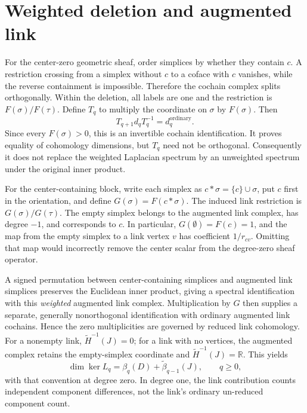 \documentclass[10pt]{article}
\newcommand{\R}{\mathbb{R}}
\begin{document}
\section{Weighted deletion and augmented link}
For the center-zero geometric sheaf, order simplices by whether they contain $c$. A restriction crossing from a simplex without $c$ to a coface with $c$ vanishes, while the reverse containment is impossible. Therefore the cochain complex splits orthogonally. Within the deletion, all labels are one and the restriction is $F(\sigma)/F(\tau)$. Define $T_q$ to multiply the coordinate on $\sigma$ by $F(\sigma)$. Then
\begin{equation}
T_{q+1}d_qT_q^{-1}=d_q^{\mathrm{ordinary}}.
\end{equation}
Since every $F(\sigma)>0$, this is an invertible cochain identification. It proves equality of cohomology dimensions, but $T_q$ need not be orthogonal. Consequently it does not replace the weighted Laplacian spectrum by an unweighted spectrum under the original inner product.

For the center-containing block, write each simplex as $c*\sigma=\{c\}\cup\sigma$, put $c$ first in the orientation, and define $G(\sigma)=F(c*\sigma)$. The induced link restriction is $G(\sigma)/G(\tau)$. The empty simplex belongs to the augmented link complex, has degree $-1$, and corresponds to $c$. In particular, $G(\emptyset)=F(c)=1$, and the map from the empty simplex to a link vertex $v$ has coefficient $1/r_{cv}$. Omitting that map would incorrectly remove the center scalar from the degree-zero sheaf operator.

A signed permutation between center-containing simplices and augmented link simplices preserves the Euclidean inner product, giving a spectral identification with this \emph{weighted} augmented link complex. Multiplication by $G$ then supplies a separate, generally nonorthogonal identification with ordinary augmented link cochains. Hence the zero multiplicities are governed by reduced link cohomology. For a nonempty link, $\widetilde H^{-1}(J)=0$; for a link with no vertices, the augmented complex retains the empty-simplex coordinate and $\widetilde H^{-1}(J)=\R$. This yields
\begin{equation}
\dim\ker L_q=\beta_q(D)+\widetilde\beta_{q-1}(J),\qquad q\geq0,
\end{equation}
with that convention at degree zero. In degree one, the link contribution counts independent component differences, not the link's ordinary un-reduced component count.
\end{document}
